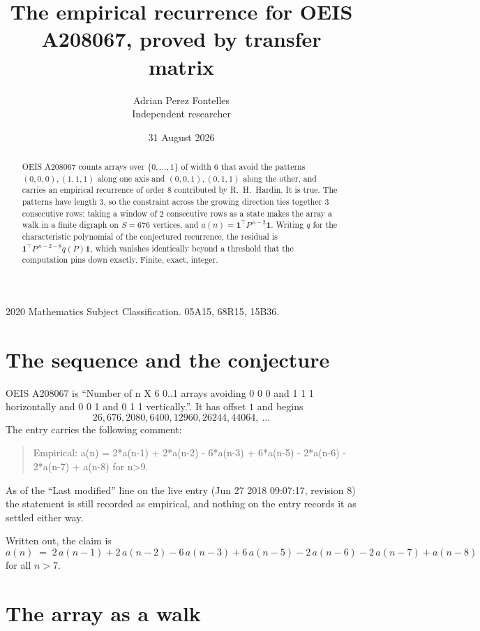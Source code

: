 \documentclass[11pt,a4paper]{article}
\title{The empirical recurrence for OEIS A208067, proved by transfer matrix}
\author{Adrian Perez Fontelles\\ \small Independent researcher}
\date{31 August 2026}
\theoremstyle{plain}
\theoremstyle{definition}
\begin{document}
\maketitle

\begin{abstract}
OEIS A208067 counts arrays over $\{0,\dots,1\}$ of width $6$ that avoid the patterns
$(0,0,0), (1,1,1)$ along one axis and $(0,0,1), (0,1,1)$ along the other, and carries an empirical recurrence of
order $8$ contributed by R.~H.~Hardin. It is true. The patterns have length $3$, so
the constraint across the growing direction ties together $3$ consecutive rows: taking a
window of $2$ consecutive rows as a state makes the array a walk in a finite digraph
on $S=676$ vertices, and $a(n)=\mathbf{1}^{\!\top}P^{\,n-2}\mathbf{1}$. Writing $q$
for the characteristic polynomial of the conjectured recurrence, the residual is
$\mathbf{1}^{\!\top}P^{\,n-2-8}q(P)\mathbf{1}$, which vanishes identically
beyond a threshold that the computation pins down exactly. Finite, exact, integer.
\end{abstract}

\noindent\small 2020 Mathematics Subject Classification. 05A15, 68R15, 15B36.\normalsize

\section{The sequence and the conjecture}

OEIS A208067 is ``Number of n X 6 0..1 arrays avoiding 0 0 0 and 1 1 1 horizontally and 0 0 1 and 0 1 1 vertically.''. It has offset
$1$ and begins
\[
26, 676, 2080, 6400, 12960, 26244, 44064,\ \dots
\]
The entry carries the following comment:
\begin{quote}\small
Empirical: a(n) = 2*a(n-1) + 2*a(n-2) - 6*a(n-3) + 6*a(n-5) - 2*a(n-6) - 2*a(n-7) + a(n-8) for n>9.
\end{quote}
As of the ``Last modified'' line on the live entry (Jun 27 2018 09:07:17, revision
8) the statement is still recorded as empirical, and nothing on the entry
records it as settled either way.

Written out, the claim is
\begin{equation}\label{eq:conj}
a(n)\;=\;2\,a(n-1) + 2\,a(n-2) - 6\,a(n-3) + 6\,a(n-5) - 2\,a(n-6) - 2\,a(n-7) + a(n-8)
\end{equation}
for all $n>7$. 

\section{The array as a walk}
\end{document}
